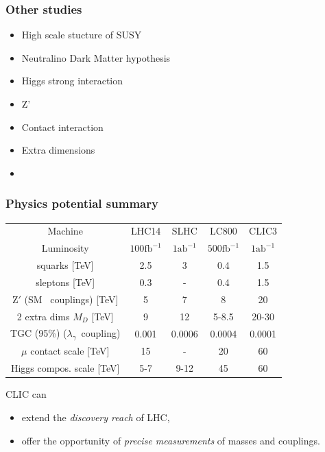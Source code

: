 \documentclass{beamer}
\begin{document}
\begin{frame}
\frametitle{Other studies}
\begin{itemize}
  \item High scale stucture of SUSY
  \item Neutralino Dark Matter hypothesis
  \item Higgs strong interaction
  \item Z'
  \item Contact interaction
  \item Extra dimensions
  \item 
\end{itemize}
\end{frame}
\begin{frame}
\frametitle{Physics potential summary}
\begin{center}
{\scriptsize
 \begin{tabular}{ ccccc }
    \toprule
 Machine &     LHC14 & SLHC & LC800 & CLIC3\\
 Luminosity & $100\textrm{fb}^{-1}$ & $1\textrm{ab}^{-1}$&
 $500\textrm{fb}^{-1}$& $1\textrm{ab}^{-1}$\\
\midrule
squarks [TeV] &   2.5 & 3 & 0.4 & 1.5 \\
sleptons [TeV] &   0.3 & - & 0.4 & 1.5 \\ 
$\textrm{Z}'$ ({\tiny SM ~couplings}) [TeV]  &  5 & 7 & 8 & 20   \\ 
2 extra dims $M_D$ [TeV]  &    9 & 12 & 5-8.5 & 20-30 \\
TGC (95\%)  ({\tiny \rm $\lambda_{\gamma} $~coupling}) &   0.001& 0.0006& 0.0004& 0.0001 \\
$\mu$ contact scale [TeV] &  15& - & 20 & 60 \\
Higgs compos. scale [TeV] & 5-7 & 9-12 & 45 & 60\\
    \bottomrule
  \end{tabular}
  }
 \end{center}
 CLIC can 
 \begin{itemize}
   \item extend the \textit{discovery reach} of LHC,
   \item offer the opportunity of \textit{precise measurements} of masses and
 couplings.
 \end{itemize}
\end{frame}
\end{document}
